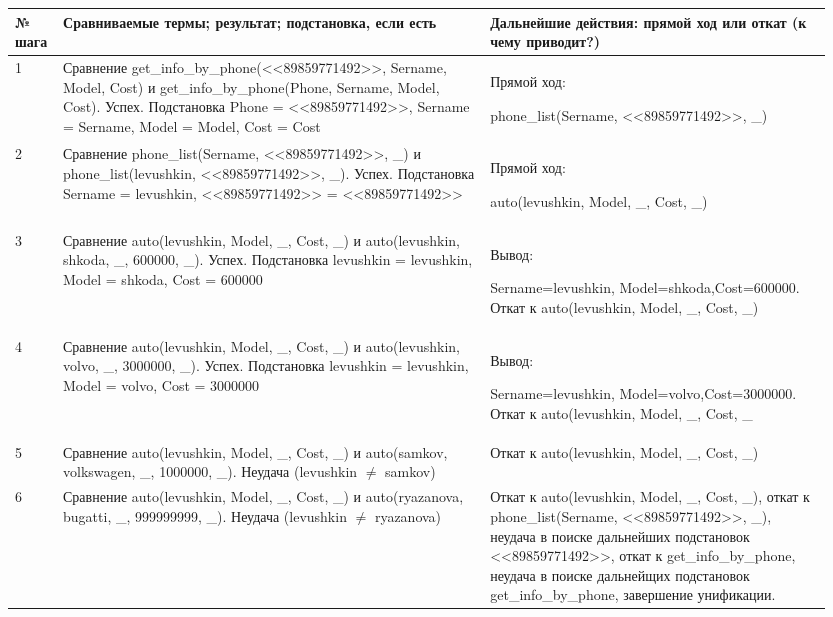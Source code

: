 \documentclass[a4paper,12pt]{article}
\begin{document}
	\begin{table} [h!]
		\begin{center}
			\begin{tabular}{|p{0.05\linewidth}|p{0.5\linewidth}|p{ 0.4\linewidth}|}
				\hline
				{\bf  № шага} & {\bf Сравниваемые термы; результат; подстановка, если есть} & {\bf Дальнейшие действия: прямой ход или откат (к чему приводит?)} \\
				\hline
				{1} & {Сравнение get\_info\_by\_phone(<<89859771492>>, Sername, Model, Cost) и get\_info\_by\_phone(Phone, Sername, Model, Cost). Успех. Подстановка Phone = <<89859771492>>, Sername = Sername, Model = Model, Cost = Cost} & {Прямой ход:
					
					phone\_list(Sername, <<89859771492>>, \_)}\\
				\hline
				{2} & {Сравнение phone\_list(Sername, <<89859771492>>, \_) и phone\_list(levushkin, <<89859771492>>, \_). Успех. Подстановка Sername = levushkin, <<89859771492>> = <<89859771492>>} & {Прямой ход: 
					
					auto(levushkin, Model, \_, Cost, \_)}\\
				\hline
				{3} & {Сравнение auto(levushkin, Model, \_, Cost, \_) и auto(levushkin, shkoda, \_, 600000, \_). Успех. Подстановка levushkin = levushkin, Model = shkoda, Cost = 600000} & {Вывод: 
					
					Sername=levushkin, Model=shkoda,Cost=600000. Откат к auto(levushkin, Model, \_, Cost, \_)}\\
				\hline
				{4} & {Сравнение auto(levushkin, Model, \_, Cost, \_) и auto(levushkin, volvo, \_, 3000000, \_). Успех. Подстановка levushkin = levushkin, Model = volvo, Cost = 3000000} & {Вывод:
					
					Sername=levushkin, Model=volvo,Cost=3000000. Откат к auto(levushkin, Model, \_, Cost, \_}\\
				\hline
				{5} & {Сравнение auto(levushkin, Model, \_, Cost, \_) и auto(samkov, volkswagen, \_, 1000000, \_). Неудача (levushkin $\neq$ samkov)} & {Откат к auto(levushkin, Model, \_, Cost, \_)}\\
				\hline
				{6} & {Сравнение auto(levushkin, Model, \_, Cost, \_) и auto(ryazanova, bugatti, \_, 999999999, \_). Неудача (levushkin $\neq$ ryazanova)} & {Откат к auto(levushkin, Model, \_, Cost, \_), откат к phone\_list(Sername, <<89859771492>>, \_), неудача в поиске дальнейших подстановок <<89859771492>>, откат к get\_info\_by\_phone, неудача в поиске дальнейщих подстановок get\_info\_by\_phone, завершение унификации.}\\
				\hline
			\end{tabular}  
			\label{m4}
		\end{center}
	\end{table}
	
\end{document}
